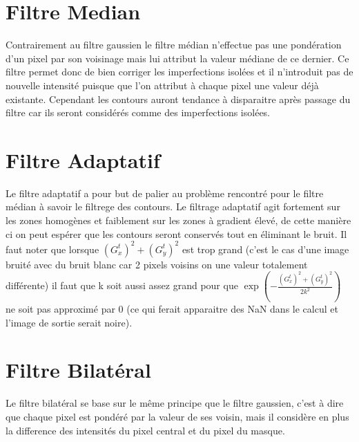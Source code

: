 \documentclass[12pt]{article}
\numberwithin{equation}{section}
\begin{document}
\section{Filtre Median}
Contrairement au filtre gaussien le filtre médian n'effectue pas une pondération d'un pixel par son voisinage mais lui attribut la valeur médiane de ce dernier. Ce filtre permet donc de bien corriger les imperfections isolées et il n'introduit pas de nouvelle intensité puisque que l'on attribut à chaque pixel une valeur déjà existante. Cependant les contours auront tendance à disparaitre après passage du filtre car ils seront considérés comme des imperfections isolées.
\section{Filtre Adaptatif}
Le filtre adaptatif a pour but de palier au problème rencontré pour le filtre médian à savoir le filtrege des contours. Le filtrage adaptatif agit fortement sur les zones homogènes et faiblement sur les zones à gradient élevé, de cette manière ci on peut espérer que les contours seront conservés tout en éliminant le bruit. Il faut noter que lorsque $(G_x^t)^2 + (G_y^t)^2$ est trop grand (c'est le cas d'une image bruité avec du bruit blanc car 2 pixels voisins on une valeur totalement différente) il faut que k soit aussi assez grand pour que $\exp(-\frac{(G_x^t)^2 + (G_y^t)^2}{2k^2})$ ne soit pas approximé par 0 (ce qui ferait apparaitre des NaN dans le calcul et l'image de sortie serait noire). 
\section{Filtre Bilatéral}
Le filtre bilatéral se base sur le même principe que le filtre gaussien, c'est à dire que chaque pixel est pondéré par la valeur de ses voisin, mais il considère en plus la difference des intensités du pixel  central et du pixel du masque. 
\end{document}
